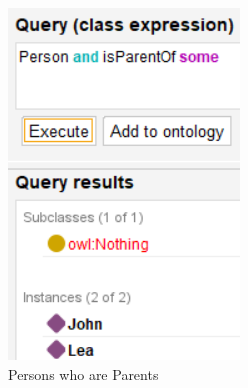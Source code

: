 \begin{figure}[h!]
\begin{minipage}[b]{0.3\textwidth}
        \includegraphics[width=\textwidth]{images/1.1 - tuto/q2.png}
        \caption{Persons who are Parents}
        \label{fig:image2}
    \end{minipage}
    \hfill
    \begin{minipage}[b]{0.3\textwidth}
        \centering

\end{minipage}
\end{figure}
